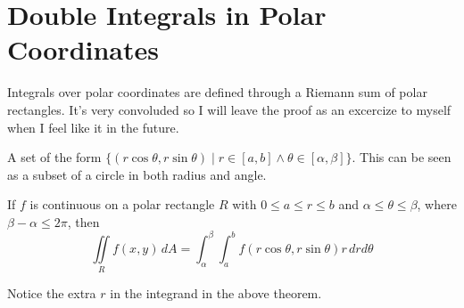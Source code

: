 \section{Double Integrals in Polar Coordinates}
Integrals over polar coordinates are defined through a Riemann sum of polar rectangles. It's very convoluded so I will leave the proof as an excercize to myself when I feel like it in the future.
\begin{definition}
    A set of the form \(\{ (r\cos \theta ,r\sin \theta )\mid r\in[a,b]\land \theta \in[\alpha ,\beta ] \} \). This can be seen as a subset of a circle in both radius and angle.
\end{definition}
\begin{theorem}
    If \(f\) is continuous on a polar rectangle \(R\) with \(0\leq a\leq r\leq b\) and \(\alpha \leq \theta \leq \beta \), where \(\beta -\alpha \leq 2\pi \), then
    \[
        \iint\limits_{R}f(x,y)\,dA = \int_\alpha^\beta \int_a^b f \left( r\cos \theta ,r\sin \theta  \right)r\,drd \theta 
    \]
\end{theorem}
Notice the extra \(r\) in the integrand in the above theorem.